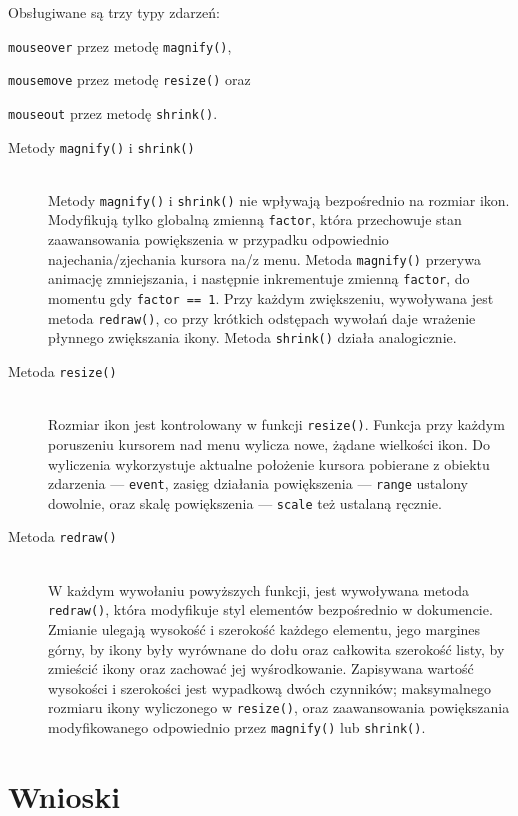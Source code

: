 \documentclass[10pt,a4paper]{article}
\newcommand{\f}[1]{\texttt{#1}}
\begin{document}
Obsługiwane są trzy typy zdarzeń:
\begin{inparaenum}
  \item \f{mouseover} przez metodę \f{magnify()},
  \item \f{mousemove} przez metodę \f{resize()} oraz
  \item \f{mouseout} przez metodę \f{shrink()}.
\end{inparaenum}
\begin{description}
  \item[Metody \f{magnify()} i \f{shrink()}] \hfill \\
    Metody \f{magnify()} i \f{shrink()} nie wpływają bezpośrednio na rozmiar
    ikon.  Modyfikują tylko globalną zmienną \f{factor}, która przechowuje stan
    zaawansowania powiększenia w przypadku odpowiednio najechania/zjechania
    kursora na/z menu.
    Metoda \f{magnify()} przerywa animację zmniejszania, i następnie
    inkrementuje zmienną \f{factor}, do momentu gdy \f{factor == 1}.  Przy
    każdym zwiększeniu, wywoływana jest metoda \f{redraw()}, co przy krótkich
    odstępach wywołań daje wrażenie płynnego zwiększania ikony. Metoda
    \f{shrink()} działa analogicznie.
  \item[Metoda \f{resize()}] \hfill \\
    Rozmiar ikon jest kontrolowany w funkcji \f{resize()}. Funkcja przy każdym
    poruszeniu kursorem nad menu wylicza nowe, żądane wielkości ikon. Do
    wyliczenia wykorzystuje aktualne położenie kursora pobierane z obiektu
    zdarzenia --- \f{event}, zasięg działania powiększenia --- \f{range}
    ustalony dowolnie, oraz skalę powiększenia --- \f{scale} też ustalaną
    ręcznie.
  \item[Metoda \f{redraw()}] \hfill \\
    W każdym wywołaniu powyższych funkcji, jest wywoływana metoda \f{redraw()},
    która modyfikuje styl elementów bezpośrednio w dokumencie. Zmianie ulegają
    wysokość i szerokość każdego elementu, jego margines górny, by ikony były
    wyrównane do dołu oraz całkowita szerokość listy, by zmieścić ikony oraz
    zachować jej wyśrodkowanie.
    Zapisywana wartość wysokości i szerokości jest wypadkową dwóch czynników;
    maksymalnego rozmiaru ikony wyliczonego w \f{resize()}, oraz zaawansowania
    powiększania modyfikowanego odpowiednio przez \f{magnify()} lub
    \f{shrink()}.
\end{description}



\section{Wnioski}
\end{document}
